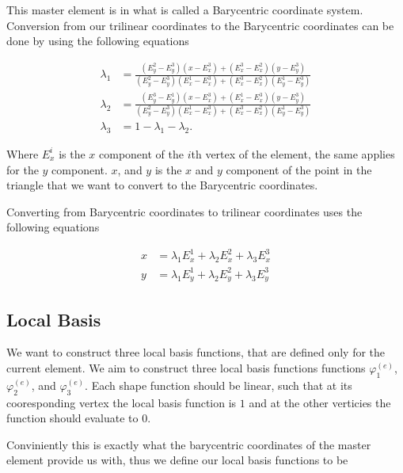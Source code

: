 \documentclass[../fem.tex]{subfiles}
\begin{document}
This master element is in what is called a Barycentric coordinate system.
Conversion from our trilinear coordinates to the Barycentric coordinates can be
done by using the following equations

\begin{align*}
  \lambda_1 &=
  \frac{\left(E^2_y-E^3_y\right)\left(x-E^3_x\right)+\left(E^3_x-E^2_x\right)\left(y-E^3_y\right)}{\left(E^2_y-E^3_y\right)\left(E^1_x-E^3_x\right)+\left(E^3_x-E^2_x\right)\left(E^1_y-E^3_y\right)}\\
  \lambda_2 &=
  \frac{\left(E^3_y-E^1_y\right)\left(x-E^3_x\right)+\left(E^1_x-E^3_x\right)\left(y-E^3_y\right)}{\left(E^2_y-E^3_y\right)\left(E^1_x-E^3_x\right)+\left(E^3_x-E^2_x\right)\left(E^1_y-E^3_y\right)}\\
  \lambda_3 &= 1-\lambda_1-\lambda_2.
\end{align*}

Where $E^i_x$ is the $x$ component of the $i$th vertex of the element, the same
applies for the $y$ component. $x$, and $y$ is the $x$ and $y$ component of the
point in the triangle that we want to convert to the Barycentric coordinates.

Converting from Barycentric coordinates to trilinear coordinates uses the
following equations

\begin{align*}
  x &= \lambda_1 E^1_x+\lambda_2 E^2_x + \lambda_3 E^3_x\\
  y &= \lambda_1 E^1_y +\lambda_2 E^2_y + \lambda_3 E^3_y
\end{align*}

\subsection{Local Basis}%
\label{sub:local_basis}


We want to construct three local basis functions, that are defined only for the
current element. We aim to construct three local basis functions functions
$\varphi_1^{(e)}$, $\varphi_2^{(e)}$, and $\varphi_3^{(e)}$.  Each shape
function should be linear, such that at its cooresponding vertex the local
basis function is $1$ and at the other verticies the function should evaluate
to $0$.


Conviniently this is exactly what the barycentric coordinates of the master
element provide us with, thus we define our local basis functions to be 
\end{document}
